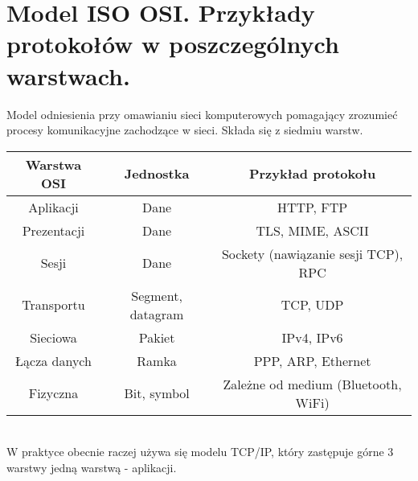 \section{Model ISO OSI. Przykłady protokołów w poszczególnych warstwach.}

Model odniesienia przy omawianiu sieci komputerowych pomagający zrozumieć procesy komunikacyjne zachodzące w sieci.
Składa się z siedmiu warstw.\\

\begin{tabular}{|c|c|c|}
    \hline
    Warstwa OSI  & Jednostka         & Przykład protokołu                  \\
    \hline
    Aplikacji    & Dane              & HTTP, FTP                           \\
    Prezentacji  & Dane              & TLS, MIME, ASCII                    \\
    Sesji        & Dane              & Sockety (nawiązanie sesji TCP), RPC \\
    Transportu   & Segment, datagram & TCP, UDP                            \\
    Sieciowa     & Pakiet            & IPv4, IPv6                          \\
    Łącza danych & Ramka             & PPP, ARP, Ethernet                  \\
    Fizyczna     & Bit, symbol       & Zależne od medium (Bluetooth, WiFi) \\
    \hline
\end{tabular}\\

W praktyce obecnie raczej używa się modelu TCP/IP, który zastępuje górne 3 warstwy jedną warstwą - aplikacji.
